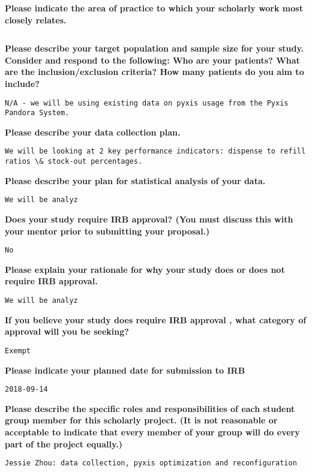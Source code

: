 \documentclass[11pt]{article}
\begin{document}
{\bfseries Please indicate the area of practice to which your scholarly work most closely relates.}
\begin{lstlisting}[mathescape]

\end{lstlisting}
\hfill

{\bfseries Please describe your target population and sample size for your study. Consider and respond to the following: Who are your patients? What are the inclusion/exclusion criteria? How many patients do you aim to include?}
\begin{lstlisting}[mathescape]
N/A - we will be using existing data on pyxis usage from the Pyxis Pandora System. 
\end{lstlisting}
\hfill

{\bfseries Please describe your data collection plan.}
\begin{lstlisting}[mathescape]
We will be looking at 2 key performance indicators: dispense to refill ratios \& stock-out percentages. 
\end{lstlisting}
\hfill

{\bfseries Please describe your plan for statistical analysis of your data.}
\begin{lstlisting}[mathescape]
We will be analyz
\end{lstlisting}
\hfill

{\bfseries Does your study require IRB approval? (You must discuss this with your mentor prior to submitting your proposal.)}
\begin{lstlisting}[mathescape]
No
\end{lstlisting}
\hfill

{\bfseries Please explain your rationale for why your study does or does not require IRB approval.}
\begin{lstlisting}[mathescape]
We will be analyz
\end{lstlisting}
\hfill

{\bfseries If you believe your study does require IRB approval , what category of approval will you be seeking?}
\begin{lstlisting}[mathescape]
Exempt
\end{lstlisting}
\hfill

{\bfseries Please indicate your planned date for submission to IRB}
\begin{lstlisting}[mathescape]
2018-09-14
\end{lstlisting}
\hfill

{\bfseries Please describe the specific roles and responsibilities of each student group member for this scholarly project. (It is not reasonable or acceptable to indicate that every member of your group will do every part of the project equally.)}
\begin{lstlisting}[mathescape]
Jessie Zhou: data collection, pyxis optimization and reconfiguration 

\end{lstlisting}
\hfill
\end{document}
